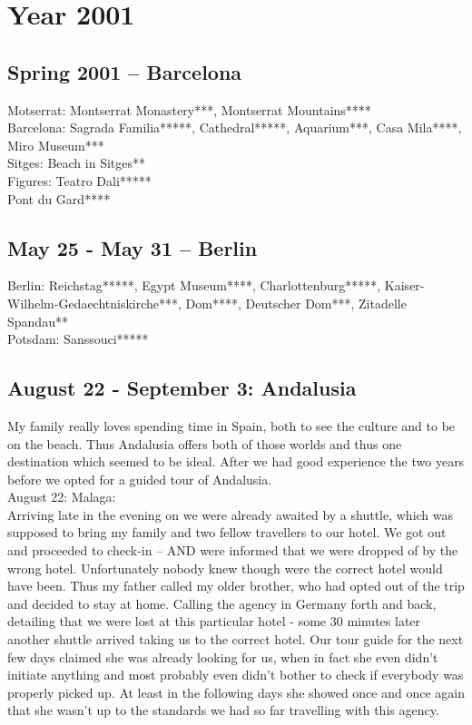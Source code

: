 \chapter{Year 2001}
\label{2001}

\section{Spring 2001 -- Barcelona}
\label{2001:Barcelona}

Motserrat: Montserrat Monastery***, Montserrat Mountains**** \\
Barcelona: Sagrada Familia*****, Cathedral*****, Aquarium***, Casa Mila****, Miro Museum***\\
Sitges: Beach in Sitges**\\  
Figures: Teatro Dali*****\\
Pont du Gard****

\section{May 25 - May 31 -- Berlin}
\label{2001:Berlin}

Berlin: Reichstag*****, Egypt Museum****, Charlottenburg*****, Kaiser-Wilhelm-Gedaechtniskirche***, Dom****, Deutscher Dom***, Zitadelle Spandau**\\
Potsdam: Sanssouci*****

\section{August 22 - September 3: Andalusia}
\label{2001:Andalusia}

My family really loves spending time in Spain, both to see the culture and to be on the beach. Thus Andalusia offers both of those worlds and thus one destination which seemed to be ideal. After we had good experience the two years before we opted for a guided tour of Andalusia.\\

August 22: Malaga:\\
Arriving late in the evening on we were already awaited by a shuttle, which was supposed to bring my family and two fellow travellers to our hotel. We got out and proceeded to check-in -- AND were informed that we were dropped of by the wrong hotel. Unfortunately nobody knew though were the correct hotel would have been. Thus my father called my older brother, who had opted out of the trip and decided to stay at home. Calling the agency in Germany forth and back, detailing that we were lost at this particular hotel - some 30 minutes later another shuttle arrived taking us to the correct hotel. Our tour guide for the next few days claimed she was already looking for us, when in fact she even didn't initiate anything and most probably even didn't bother to check if everybody was properly picked up. At least in the following days she showed once and once again that she wasn't up to the standards we had so far travelling with this agency.\\


